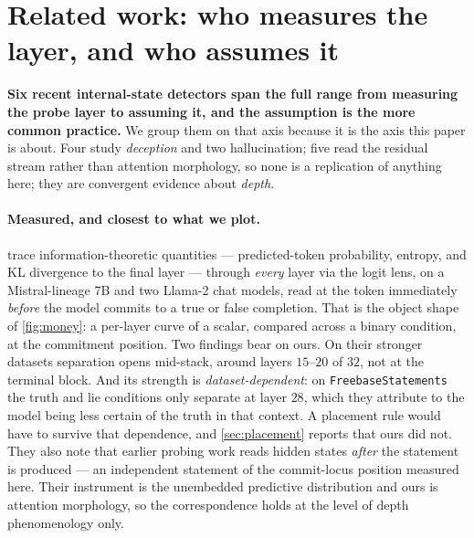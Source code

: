 \documentclass[10pt, letterpaper]{article}
\begin{document}
\begin{table}[t]
  \centering\footnotesize
  
  \caption{\textbf{Registered endpoint ledger.} Every endpoint with its frozen bar
  and its actual outcome. The denominator is always $12$, including the three
  aborted cells.}
  \label{tab:ledger}
\end{table}

\FloatBarrier

\section{Related work: who measures the layer, and who assumes it}
\label{sec:related}

\textbf{Six recent internal-state detectors span the full range from measuring the probe layer
to assuming it, and the assumption is the more common practice.} We group them on that axis
because it is the axis this paper is about. Four study \emph{deception} and two
hallucination; five read the residual stream rather than attention morphology, so none is a
replication of anything here; they are convergent evidence about \emph{depth}.

\paragraph{Measured, and closest to what we plot.} \citet{dombrowski2024lying} trace
information-theoretic quantities --- predicted-token probability, entropy, and KL divergence to
the final layer --- through \emph{every} layer via the logit lens, on a Mistral-lineage 7B and two
Llama-2 chat models, read at the token immediately \emph{before} the model commits to a true or
false completion. That is the object shape of \cref{fig:money}: a per-layer curve of a scalar,
compared across a binary condition, at the commitment position. Two findings bear on ours.
On their stronger datasets separation opens mid-stack, around layers $15$--$20$ of $32$, not at the
terminal block. And its strength is \emph{dataset-dependent}: on \texttt{FreebaseStatements} the
truth and lie conditions only separate at layer $28$, which they attribute to the model being less
certain of the truth in that context. A
placement rule would have to survive that dependence, and \cref{sec:placement} reports that ours
did not. They also note that earlier probing work reads hidden states \emph{after} the statement
is produced --- an independent statement of the commit-locus position measured here. Their
instrument is the unembedded predictive distribution and ours is attention morphology, so the
correspondence holds at the level of depth phenomenology only.
\end{document}
